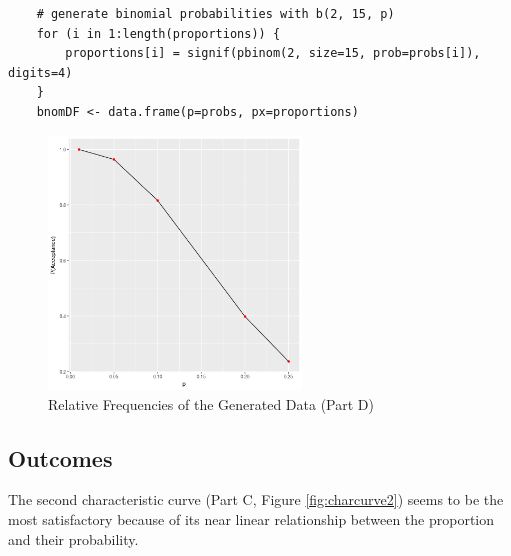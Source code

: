 \documentclass{article}
\begin{document}
\begin{lstlisting}
    # generate binomial probabilities with b(2, 15, p)
    for (i in 1:length(proportions)) {
        proportions[i] = signif(pbinom(2, size=15, prob=probs[i]), digits=4)
    }
    bnomDF <- data.frame(p=probs, px=proportions)
\end{lstlisting}

            \begin{figure}[h]
                \begin{center}
                    \includegraphics[width=0.6\textwidth]{figures/charcurve3.png}
                    \caption{Relative Frequencies of the Generated Data (Part D)} \label{fig:charcurve3}
                \end{center}
            \end{figure}

        \subsection{Outcomes}
            The second characteristic curve (Part C, Figure \ref{fig:charcurve2}) seems to be the most satisfactory because of its near linear relationship between the proportion and their probability.

    \clearpage
    \newpage
\end{document}
